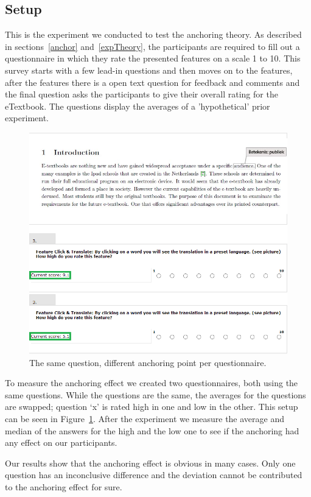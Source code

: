 \documentclass[main.tex]{subfiles}
\begin{document}
\label{exp:anchor}

\subsection{Setup}
This is the experiment we conducted to test the anchoring theory. As described in sections~\ref{anchor} and~\ref{expTheory}, the participants are required to fill out a questionnaire in which they rate the presented features on a scale 1 to 10. This survey starts with a few lead-in questions and then moves on to the features, after the features there is a open text question for feedback and comments and the final question asks the participants to give their overall rating for the eTextbook. The questions display the averages of a 'hypothetical' prior experiment.  

\begin{figure}
\includegraphics[width=1\textwidth]{QuestionComparison.png}
\caption{The same question, different anchoring point per questionnaire.}
\label{fig:qComp}
\end{figure}

To measure the anchoring effect we created two questionnaires, both using the same questions. While the questions are the same, the averages for the questions are swapped; question `x' is rated high in one and low in the other. This setup can be seen in Figure~\ref{fig:qComp}. After the experiment we measure the average and median of the answers for the high and the low one to see if the anchoring had any effect on our participants.

Our results show that the anchoring effect is obvious in many cases. Only one question has an inconclusive difference and the deviation cannot be contributed to the anchoring effect for sure.
\end{document}
